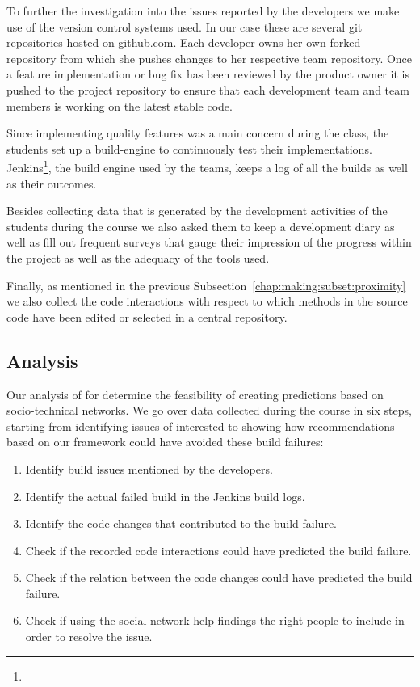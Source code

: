 To further the investigation into the issues reported by the developers we make use of the version control systems used.
In our case these are several git repositories hosted on github.com.
Each developer owns her own forked repository from which she pushes changes to her respective team repository.
Once a feature implementation or bug fix has been reviewed by the product owner it is pushed to the project repository to ensure that each development team and team members is working on the latest stable code.

Since implementing quality features was a main concern during the class, the students set up a build-engine to continuously test their implementations.
Jenkins\footnote{}, the build engine used by the teams, keeps a log of all the builds as well as their outcomes.

Besides collecting data that is generated by the development activities of the students during the course we also asked them to keep a development diary as well as fill out frequent surveys that gauge their impression of the progress within the project as well as the adequacy of the tools used.

Finally, as mentioned in the previous Subsection~\ref{chap:making:subset:proximity} we also collect the code interactions with respect to which methods in the source code have been edited or selected in a central repository.

\subsection{Analysis}
Our analysis of for determine the feasibility of creating predictions based on socio-technical networks.
We go over data collected during the course in six steps, starting from identifying issues of interested to showing how recommendations based on our framework could have avoided these build failures:

\begin{enumerate}
\item Identify build issues mentioned by the developers.
\item Identify the actual failed build in the Jenkins build logs.
\item Identify the code changes that contributed to the build failure.
\item Check if the recorded code interactions could have predicted the build failure.
\item Check if the relation between the code changes could have predicted the build failure.
\item Check if using the social-network help findings the right people to include in order to resolve the issue.
\end{enumerate}

